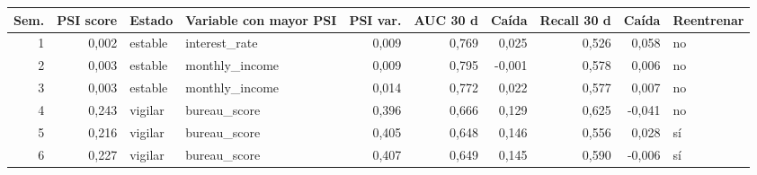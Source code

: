 \footnotesize
\begin{tabularx}{\linewidth}{r r l X r r r r r l}
\toprule
\textbf{Sem.} & \textbf{PSI score} & \textbf{Estado} & \textbf{Variable con mayor PSI} & \textbf{PSI var.} & \textbf{AUC 30 d} & \textbf{Caída} & \textbf{Recall 30 d} & \textbf{Caída} & \textbf{Reentrenar} \\
\midrule
1 & 0,002 & estable & interest\_\allowbreak{}rate & 0,009 & 0,769 & 0,025 & 0,526 & 0,058 & no \\
2 & 0,003 & estable & monthly\_\allowbreak{}income & 0,009 & 0,795 & -0,001 & 0,578 & 0,006 & no \\
3 & 0,003 & estable & monthly\_\allowbreak{}income & 0,014 & 0,772 & 0,022 & 0,577 & 0,007 & no \\
4 & 0,243 & vigilar & bureau\_\allowbreak{}score & 0,396 & 0,666 & 0,129 & 0,625 & -0,041 & no \\
5 & 0,216 & vigilar & bureau\_\allowbreak{}score & 0,405 & 0,648 & 0,146 & 0,556 & 0,028 & sí \\
6 & 0,227 & vigilar & bureau\_\allowbreak{}score & 0,407 & 0,649 & 0,145 & 0,590 & -0,006 & sí \\
\bottomrule
\end{tabularx}

